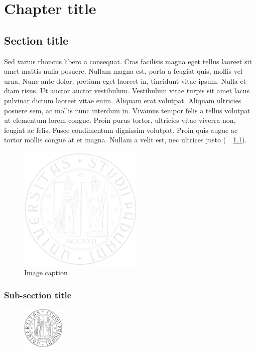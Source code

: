 \chapter{Chapter title} %
\thispagestyle{empty}

\section{Section title}
Sed varius rhoncus libero a consequat. Cras facilisis magna eget tellus laoreet sit amet mattis nulla posuere. Nullam magna est, porta a feugiat quis, mollis vel urna. Nunc ante dolor, pretium eget laoreet in, tincidunt vitae ipsum. Nulla et diam risus. Ut auctor auctor vestibulum. Vestibulum vitae turpis sit amet lacus pulvinar dictum laoreet vitae enim. Aliquam erat volutpat. Aliquam ultricies posuere sem, ac mollis nunc interdum in. Vivamus tempor felis a tellus volutpat ut elementum lorem congue. Proin purus tortor, ultricies vitae viverra non, feugiat ac felis. Fusce condimentum dignissim volutpat. Proin quis augue ac tortor mollis congue at et magna. Nullam a velit est, nec ultrices justo (\seename\ \figurename~\ref{unipd-logo}).

\begin{figure}[ht]
  \centering
  \includegraphics[height=6cm]{images/unipd-light.png}
  \caption{Image caption}\label{unipd-logo}
\end{figure}

\subsection{Sub-section title}
\begin{figure}
  \vspace{-20pt}
  \begin{center}
  \includegraphics[width=2cm]{images/unipd-bn.png}
  \end{center}
  \vspace{-10pt}
\end{figure}

